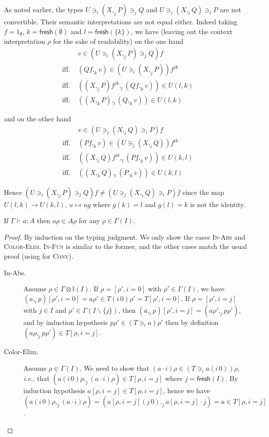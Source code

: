 \documentclass[english]{PaperTools/latex/lipics}
\newcommand\op[1]{∋_{#1}}
\def\fresh#1{\mathsf{fresh}(#1)}
\def\ie{\textit{i.e.}}
\begin{document}
\begin{remark}
  As noted earlier, the types
  $U \op i (X ,_j P) \op j Q$ and $U \op j (X ,_i Q) \op i P$
  are not convertible.
  Their semantic interpretations are not equal either.  Indeed
  taking $f = 1_∅$, $k = \fresh{∅}$ and $l = \fresh{\{k\}}$,
  we have
  (leaving out the context interpretation $ρ$ for the sake of
  readability)
  on the one hand
  \begin{align*}
    &v ∈ (U \op i (X ,_j P) \op j Q) f
    \\
    \text{ iff. }& (Qf ,_k v) ∈ (U \op i (X ,_j P))f^{jk}
    \\
    \text{ iff. }& ((X ,_j P)f^{jk} ,_l (Qf ,_k v)) ∈ U(l,k)
    \\
    \text{ iff. }& ((X ,_k P) ,_l (Q ,_k v)) ∈ U(l,k)
  \end{align*}

  and on the other hand
  \begin{align*}
    &v ∈ (U \op j (X ,_i Q) \op i P) f
    \\
    \text{ iff. }& (Pf ,_k v) ∈ (U \op j (X ,_i Q))f^{ik}
    \\
    \text{ iff. }& ((X ,_i Q)f^{ik} ,_l (Pf ,_k v)) ∈ U(k,l)
    \\
    \text{ iff. }& ((X ,_k Q) ,_l (P ,_k v)) ∈ U(k,l)
  \end{align*}

  Hence $(U \op i (X ,_j P) \op j Q) f ≠ (U \op j (X ,_i Q) \op i P) f$
  since the map $U(l,k) → U(k,l)$, $u ↦ ug$ where $g(k) = l$ and $g(l)=k$
  is not the identity.
\end{remark}


\begin{theorem}[Validity]
  If $Γ ⊢ a : A$ then $aρ ∈ Aρ$ for any $ρ ∈ Γ(I)$.
\end{theorem}
\begin{proof}
  By induction on the typing judgment.  We only show the cases \textsc{In-Abs} and \textsc{Color-Elim}.  \textsc{In-Fun} is similar to the former, and the other
  cases match the usual proof (using  for \textsc{Conv}).
  \begin{description}
    \item[\sc In-Abs.]
      Assume $ρ ∈ Γ⊗𝕀(I)$.
      If $ρ = [ρ',i=0]$ with $ρ' ∈ Γ(I)$, we have
      $(a ,_i p)[ρ',i=0] = aρ' ∈ T(i\,0)ρ' = T[ρ',i=0]$.
      If $ρ = [ρ',i=j]$ with $j ∈ I$ and $ρ' ∈ Γ(I\backslash\{j\})$, then
      $(a ,_i p)[ρ',i=j] = (aρ' ,_j pρ')$,
      and by induction hypothesis
      $pρ' ∈ (T \op {i} a)ρ'$ then by definition
      $(aρ ,_j pρ') ∈ T[ρ,i=j]$.

    \item[\sc Color-Elim.]
      Assume $ρ ∈ Γ(I)$.
      We need to show that $(a·i)ρ ∈ (T \op i {a(i\,0)})ρ$, \ie, that
      $ (a(i\,0)ρ ,_j (a·i)ρ) ∈ T[ρ,i=j]$ where $j = \fresh I$.
      By induction hypothesis $a[ρ,i=j] ∈ T[ρ,i=j]$, hence
      we have
      $(a(i\,0)ρ ,_j (a·i)ρ) = (a[ρ,i=j](j\,0) ,_j a[ρ,i=j]·j) = a ∈ T[ρ,i=j]$.
    \qedhere
  \end{description}

\end{proof}
\end{document}
